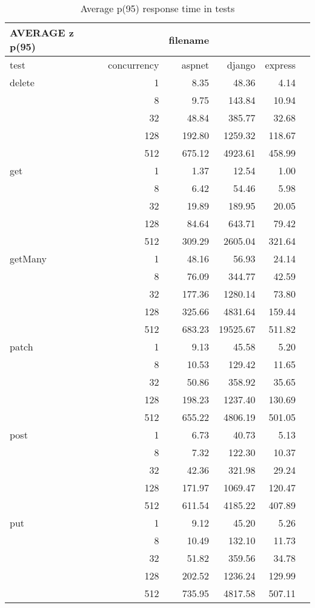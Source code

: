 \begin{table}[!htp]\centering
\caption{Average p(95) response time in tests}\label{tab:resultsFromFile}
\scriptsize
\begin{tabular}{lrrrrr}\toprule
AVERAGE z p(95) & &filename & & \\\midrule
test &concurrency &aspnet &django &express \\
delete &1 &8.35 &48.36 &4.14 \\
&8 &9.75 &143.84 &10.94 \\
&32 &48.84 &385.77 &32.68 \\
&128 &192.80 &1259.32 &118.67 \\
&512 &675.12 &4923.61 &458.99 \\
get &1 &1.37 &12.54 &1.00 \\
&8 &6.42 &54.46 &5.98 \\
&32 &19.89 &189.95 &20.05 \\
&128 &84.64 &643.71 &79.42 \\
&512 &309.29 &2605.04 &321.64 \\
getMany &1 &48.16 &56.93 &24.14 \\
&8 &76.09 &344.77 &42.59 \\
&32 &177.36 &1280.14 &73.80 \\
&128 &325.66 &4831.64 &159.44 \\
&512 &683.23 &19525.67 &511.82 \\
patch &1 &9.13 &45.58 &5.20 \\
&8 &10.53 &129.42 &11.65 \\
&32 &50.86 &358.92 &35.65 \\
&128 &198.23 &1237.40 &130.69 \\
&512 &655.22 &4806.19 &501.05 \\
post &1 &6.73 &40.73 &5.13 \\
&8 &7.32 &122.30 &10.37 \\
&32 &42.36 &321.98 &29.24 \\
&128 &171.97 &1069.47 &120.47 \\
&512 &611.54 &4185.22 &407.89 \\
put &1 &9.12 &45.20 &5.26 \\
&8 &10.49 &132.10 &11.73 \\
&32 &51.82 &359.56 &34.78 \\
&128 &202.52 &1236.24 &129.99 \\
&512 &735.95 &4817.58 &507.11 \\
\bottomrule
\end{tabular}
\end{table}